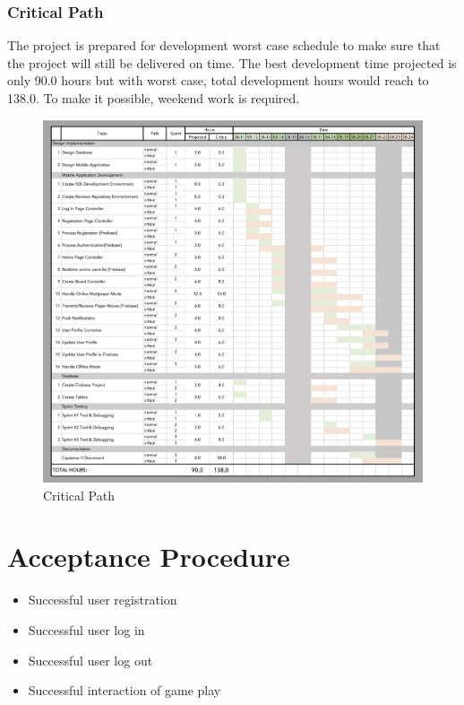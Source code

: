 \documentclass{article}
\begin{document}
        \subsubsection{Critical Path}
        The project is prepared for development worst case schedule to make sure that the project will still be delivered on time.  The best development time projected is only 90.0 hours but with worst case, total development hours would reach to 138.0. To make it possible, weekend work is required.
        \begin{figure}[h]
            \centering
            \includegraphics[width=5.5in]{images/Gantt Critical.png}
        \caption{Critical Path}
        \end{figure}
        \newpage
        
        
\section{Acceptance Procedure}
    \begin{itemize}
        \item Successful user registration
        \item Successful user log in
        \item Successful user log out
        \item Successful interaction of game play
    \end{itemize}
    ~\\
    
\end{document}
